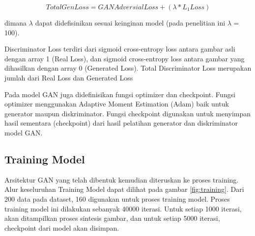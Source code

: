 \documentclass[conference]{IEEEtran}
\begin{document}
\begin{equation}
  \label{eq:genLoss}
  Total Gen Loss = GAN Adversial Loss + (\lambda * L_{1} Loss) 
\end{equation}

dimana $\lambda$ dapat didefisinikan sesuai keinginan model (pada penelitian ini $\lambda$ = 100).

Discriminator Loss terdiri dari sigmoid cross-entropy loss antara gambar asli dengan array 1 (Real Loss), dan sigmoid cross-entropy loss antara gambar yang dihasilkan dengan array 0 (Generated Loss). 
Total Discriminator Loss merupakan jumlah dari Real Loss dan Generated Loss

Pada model GAN juga didefinisikan fungsi optimizer dan checkpoint.
Fungsi optimizer menggunakan Adaptive Moment Estimation (Adam) baik untuk generator maupun diskriminator. 
Fungsi checkpoint digunakan untuk menyimpan hasil sementara (checkpoint) dari hasil pelatihan generator dan diskriminator model GAN.

\subsection{Training Model}
Arsitektur GAN yang telah dibentuk kemudian diteruskan ke proses training. 
Alur keseluruhan Training Model dapat dilihat pada gambar \ref{fig:training}. 
Dari 200 data pada dataset, 160 digunakan untuk proses training model. 
Proses training model ini dilakukan sebanyak 40000 iterasi. 
Untuk setiap 1000 iterasi, akan ditampilkan proses sintesis gambar, dan untuk setiap 5000 iterasi, checkpoint dari model akan disimpan.
\end{document}
